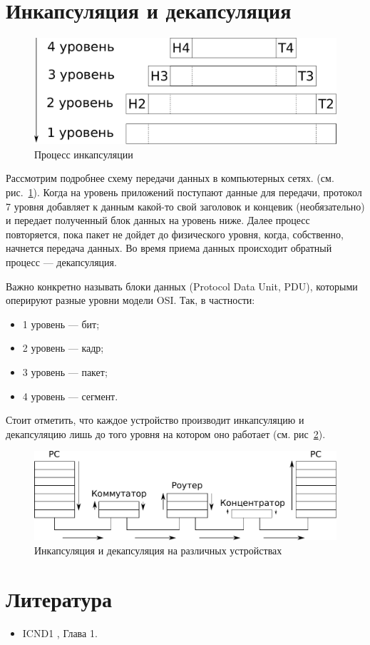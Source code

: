 \section{Инкапсуляция и декапсуляция}
\begin{figure}[h!]
	\centering
	\includegraphics[width=0.8\linewidth]{pic/incapsulation.pdf}
	\caption{Процесс инкапсуляции}
	\label{fig:incapsulation}
\end{figure}
Рассмотрим подробнее схему передачи данных в компьютерных сетях. (см. рис.~\ref{fig:incapsulation}). Когда на уровень приложений поступают данные для передачи, протокол 7 уровня добавляет к данным какой-то свой заголовок и концевик (необязательно) и передает полученный блок данных на уровень ниже. Далее процесс повторяется, пока пакет не дойдет до физического уровня, когда, собственно, начнется передача данных. Во время приема данных происходит обратный процесс --- декапсуляция. 

Важно конкретно называть блоки данных (Protocol Data Unit, PDU), которыми оперируют разные уровни модели OSI. Так, в частности:
\begin{itemize}
	\item 1 уровень --- бит;
	\item 2 уровень --- кадр;
	\item 3 уровень --- пакет;
	\item 4 уровень --- сегмент.
\end{itemize}

Стоит отметить, что каждое устройство производит инкапсуляцию и декапсуляцию лишь до того уровня на котором оно работает (см. рис~\ref{fig:incapsulation_devices}).
\begin{figure}[h!]
	\centering
	\includegraphics[width=0.8\linewidth]{pic/incapsulation_devices.pdf}
	\caption{Инкапсуляция и декапсуляция на различных устройствах}
	\label{fig:incapsulation_devices}
\end{figure}

\section{Литература}
\begin{itemize}
	\item ICND1 \cite{icnd1eng}, Глава 1.
\end{itemize}